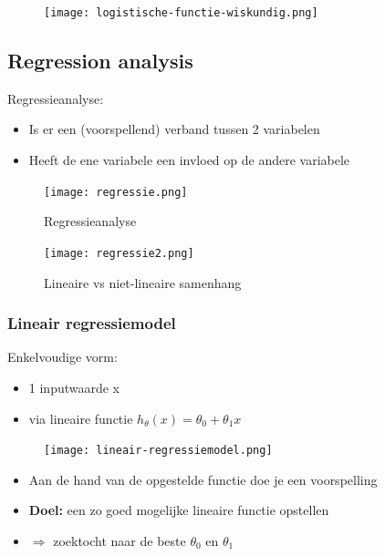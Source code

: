 \documentclass{article}
\begin{document}
\begin{figure}[H]
    \centering
    \texttt{[image: logistische-functie-wiskundig.png]}
\end{figure}

\subsection{Regression analysis}

Regressieanalyse:

\begin{itemize}
    \item Is er een (voorspellend) verband tussen 2 variabelen
    \item Heeft de ene variabele een invloed op de andere variabele
\end{itemize}

\begin{figure}[H]
    \centering
    \texttt{[image: regressie.png]}
    \caption{Regressieanalyse}
\end{figure}

\begin{figure}[H]
    \centering
    \texttt{[image: regressie2.png]}
    \caption{Lineaire vs niet-lineaire samenhang}
\end{figure}


\subsubsection{Lineair regressiemodel}

Enkelvoudige vorm: 

\begin{itemize}
    \item 1 inputwaarde x
    \item via lineaire functie $h_{\theta}(x) = \theta_0 + \theta_1x$
\end{itemize}

\begin{figure}[H]
    \centering
    \texttt{[image: lineair-regressiemodel.png]}
\end{figure}

\begin{itemize}
    \item Aan de hand van de opgestelde functie doe je een voorspelling
    \item \textbf{Doel:} een zo goed mogelijke lineaire functie opstellen
    \item $\Rightarrow$ zoektocht naar de beste $\theta_0$ en $\theta_1$
\end{itemize}
\end{document}
